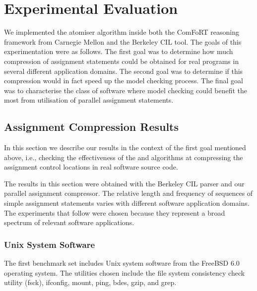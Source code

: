 \section{Experimental Evaluation}
\label{sec:experimental}

We implemented the atomiser algorithm inside both the ComFoRT
reasoning framework from Carnegie Mellon and the Berkeley CIL
\cite{cil} tool.  The goals of this experimentation were as follows.
The first goal was to determine how much compression of assignment
statements could be obtained for real programs in several different
application domains.  The second goal was to determine if this
compression would in fact speed up the model checking process.  The
final goal was to characterise the class of software where model
checking could benefit the most from utilisation of parallel
assignment statements.

\subsection{Assignment Compression Results}

In this section we describe our results in the context of the first
goal mentioned above, i.e., checking the effectiveness of the \atomizer{}
and \catomizer{} algorithms at compressing the assignment control
locations in real software source code.

The results in this section were obtained with the Berkeley CIL parser
and our parallel assignment compressor.  The relative length and
frequency of sequences of simple assignment statements varies with
different software application domains. The experiments that follow
were chosen because they represent a broad spectrum of relevant
software applications.

\subsubsection{Unix System Software}

The first benchmark set includes Unix system software from the FreeBSD
6.0 operating system.  The utilities chosen include the file system
consistency check utility (fsck), ifconfig, mount, ping, bdes, gzip,
and grep.


